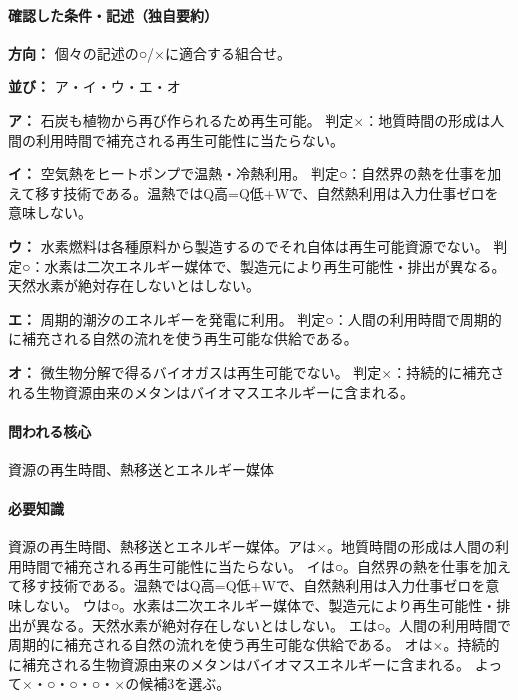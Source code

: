 \paragraph{確認した条件・記述（独自要約）}\mbox{}\par

\noindent\textbf{方向：} 個々の記述の○/×に適合する組合せ。\par

\noindent\textbf{並び：} ア・イ・ウ・エ・オ\par

\noindent\textbf{ア：} 石炭も植物から再び作られるため再生可能。 判定×：地質時間の形成は人間の利用時間で補充される再生可能性に当たらない。\par

\noindent\textbf{イ：} 空気熱をヒートポンプで温熱・冷熱利用。 判定○：自然界の熱を仕事を加えて移す技術である。温熱ではQ高=Q低+Wで、自然熱利用は入力仕事ゼロを意味しない。\par

\noindent\textbf{ウ：} 水素燃料は各種原料から製造するのでそれ自体は再生可能資源でない。 判定○：水素は二次エネルギー媒体で、製造元により再生可能性・排出が異なる。天然水素が絶対存在しないとはしない。\par

\noindent\textbf{エ：} 周期的潮汐のエネルギーを発電に利用。 判定○：人間の利用時間で周期的に補充される自然の流れを使う再生可能な供給である。\par

\noindent\textbf{オ：} 微生物分解で得るバイオガスは再生可能でない。 判定×：持続的に補充される生物資源由来のメタンはバイオマスエネルギーに含まれる。\par

\paragraph{問われる核心} 資源の再生時間、熱移送とエネルギー媒体

\paragraph{必要知識} 資源の再生時間、熱移送とエネルギー媒体。アは×。地質時間の形成は人間の利用時間で補充される再生可能性に当たらない。 イは○。自然界の熱を仕事を加えて移す技術である。温熱ではQ高=Q低+Wで、自然熱利用は入力仕事ゼロを意味しない。 ウは○。水素は二次エネルギー媒体で、製造元により再生可能性・排出が異なる。天然水素が絶対存在しないとはしない。 エは○。人間の利用時間で周期的に補充される自然の流れを使う再生可能な供給である。 オは×。持続的に補充される生物資源由来のメタンはバイオマスエネルギーに含まれる。 よって×・○・○・○・×の候補3を選ぶ。

